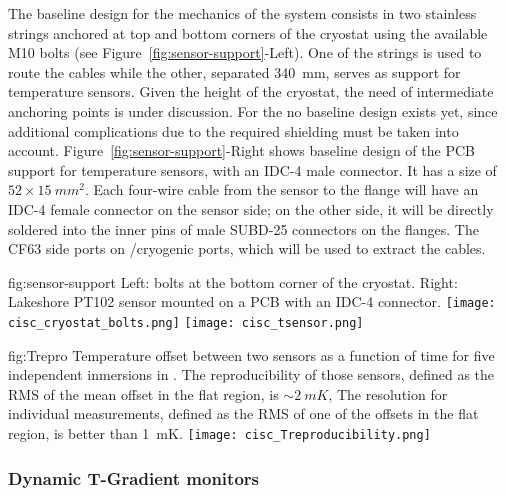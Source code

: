 The baseline design for the mechanics of the \single system consists in two stainless strings anchored at top and bottom corners of the cryostat
using the available M10 bolts (see Figure~\ref{fig:sensor-support}-Left). One of the strings is used to route the cables while the other,
separated \SI{340}{mm}, serves as support for temperature sensors.
Given the height of the cryostat, the need of intermediate anchoring points is under discussion. For the  no baseline design exists yet,
since additional complications due to the required \efield shielding must be taken into account. Figure~\ref{fig:sensor-support}-Right shows baseline design of the
PCB support for temperature sensors, with an IDC-4 male connector. It has a size of $52\times \SI{15}{mm^2}$. Each four-wire cable from the sensor to the flange will have an IDC-4 female connector
on the sensor side; on the other side, it will be directly soldered into the inner pins of male SUBD-25 connectors on the flanges. The CF63 side ports on /cryogenic ports,
which will be used to extract the cables. 

\begin{dunefigure}{fig:sensor-support}
  {Left: bolts at the bottom corner of the cryostat. Right: Lakeshore PT102 sensor mounted on a PCB with an IDC-4 connector.}
  \texttt{[image: cisc\_cryostat\_bolts.png]}%
    \hspace{1cm}%
  \texttt{[image: cisc\_tsensor.png]}%
\end{dunefigure}


\begin{dunefigure}{fig:Trepro}
  {Temperature offset between two sensors as a function of time for five independent inmersions in \lar. The reproducibility of those sensors,
    defined as the RMS of the mean offset in the flat region, is $\sim \SI{2}{mK}$,
    The resolution for individual measurements, defined as the RMS of one of the offsets in the flat region, is better than \SI{1}{mK}.}
  \texttt{[image: cisc\_Treproducibility.png]}%
\end{dunefigure}


\subsubsection{Dynamic T-Gradient monitors}

